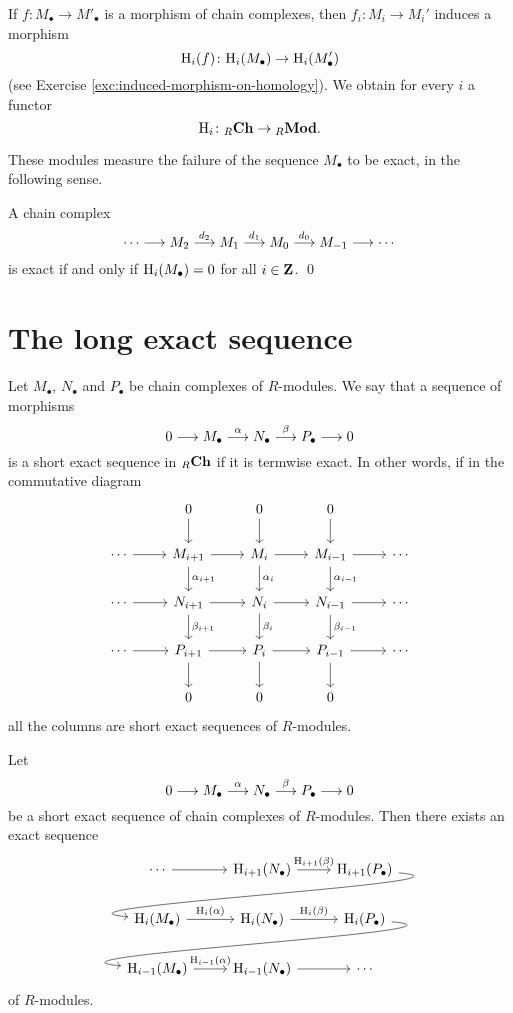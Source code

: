 If $f\colon M_\bullet \to M'_\bullet$ is a morphism of chain complexes, then $f_i\colon M_i \to M_i'$ induces a morphism
\[
	{\mathrm H}_i(f)  \colon {\mathrm H}_i(M_\bullet) \to {\mathrm H}_i(M'_\bullet)
\]
(see Exercise \ref{exc:induced-morphism-on-homology}). We obtain for every $i$ a functor
\[
	{\mathrm H}_i \colon {}_R\mathbf{Ch} \to {}_R\mathbf{Mod}.
\]

These modules measure the failure of the sequence $M_\bullet$ to be exact, in the following sense.

\begin{lemma}
A chain complex
\[
	\cdots \longrightarrow M_2 \overset{d_2}{\longrightarrow} M_1 \overset{d_1}{\longrightarrow}  M_0 
	\overset{d_0}{\longrightarrow} M_{-1} \longrightarrow \cdots 
\]
is exact if and only if ${\mathrm H}_i(M_\bullet)=0$ for all $i\in {\mathbf{Z}}$. \qed
\end{lemma}

\section{The long exact sequence}

Let $M_\bullet$, $N_\bullet$ and $P_\bullet$ be chain complexes of $R$-modules. 
We say that a sequence of morphisms  
\[
	0 \longrightarrow M_\bullet \overset{\alpha}{\longrightarrow} N_\bullet 
	\overset{\beta}{\longrightarrow} P_\bullet \longrightarrow 0
\]
is a short exact sequence in ${}_R\mathbf{Ch}$ if it is termwise exact. In other words, 
if in the commutative diagram
\[
\begin{tikzcd}
	& 0  \arrow{d}
	& 0 \arrow{d}
	& 0 \arrow{d}
	&  \\
\cdots \arrow{r}
	& M_{i+1} \arrow{r}{} \arrow{d}{\alpha_{i+1}} 
	& M_{i} \arrow{r}{} \arrow{d}{\alpha_{i}} 
	& M_{i-1} \arrow{r} \arrow{d}{\alpha_{i-1}} 
	& \cdots \\
\cdots \arrow{r}
	& N_{i+1} \arrow{r}{} \arrow{d}{\beta_{i+1}} 
	& N_{i} \arrow{r}{} \arrow{d}{\beta_{i}} 
	& N_{i-1} \arrow{r} \arrow{d}{\beta_{i-1}} 
	& \cdots \\
\cdots \arrow{r}
	& P_{i+1} \arrow{r}{} \arrow{d}
	& P_{i} \arrow{r}{}  \arrow{d}
	& P_{i-1} \arrow{r} \arrow{d}
	& \cdots \\
	& 0 
	& 0 
	& 0  
	&  
\end{tikzcd}
\]
all the columns are short exact sequences of $R$-modules. 

\begin{theorem}\label{thm:long-exact-sequence}
Let 
\[
	0 \longrightarrow M_\bullet \overset{\alpha}{\longrightarrow} N_\bullet 
	\overset{\beta}{\longrightarrow} P_\bullet \longrightarrow 0
\]
be a short exact sequence of chain complexes of $R$-modules. Then there exists
an exact sequence
\[
\begin{tikzcd}
 	\cdots \arrow{r}
 	& \rH_{i+1}(N_\bullet) \arrow{r}{\rH_{i+1}(\beta)}
 	& \rH_{i+1}(P_\bullet) \arrow[out=-5, in=175]{dll} \\
 	\rH_{i}(M_\bullet) \arrow{r}{\rH_{i}(\alpha)}
 	& \rH_{i}(N_\bullet) \arrow{r}{\rH_{i}(\beta)}
 	& \rH_{i}(P_\bullet) \arrow[out=-5, in=175]{dll} \\
 	\rH_{i-1}(M_\bullet) \arrow{r}{\rH_{i-1}(\alpha)}
 	& \rH_{i-1}(N_\bullet) \arrow{r}
 	& \cdots 
\end{tikzcd}
\]
of $R$-modules.
\end{theorem}

